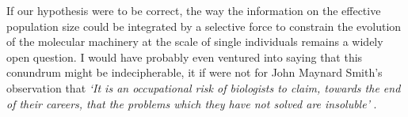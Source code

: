 If our hypothesis were to be correct, the way the information on the effective population size could be integrated by a selective force to constrain the evolution of the molecular machinery at the scale of single individuals remains a widely open question.
%
I would have probably even ventured into saying that this conundrum might be indecipherable, it if were not for John Maynard Smith's observation that \textit{‘It is an occupational risk of biologists to claim, towards the end of their careers, that the problems which they have not solved are insoluble’} \citep{smith1988games}.


